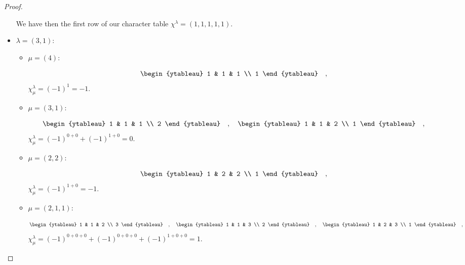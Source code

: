 \documentclass[8pt]{extarticle}
\newcommand{\<}{\langle}
\renewcommand{\>}{\rangle}
\theoremstyle{definition}
\begin{document}
\begin{proof}
\begin{itemize}
    We have then the first row of our character table $\chi^{\lambda} = (1,1,1,1,1)$.    
  \item
    $\lambda = (3,1)$:
    
    \begin{itemize}
      
    \item
      $\mu = (4)$:
      
      \begin{align*}
        \begin{ytableau}
          1 & 1 & 1 \\
          1
        \end{ytableau}\quad,
      \end{align*}
      $\chi_{\mu}^{\lambda}  = (-1)^{1} = -1$.

    \item
      $\mu = (3,1)$:
      
      \begin{align*}
        \begin{ytableau}
          1 & 1 & 1 \\
          2
        \end{ytableau}\quad,\quad
        \begin{ytableau}
          1 & 1 & 2 \\
          1
        \end{ytableau}\quad,        
      \end{align*}
      $\chi_{\mu}^{\lambda}  = (-1)^{0+0} + (-1)^{1 + 0} = 0$.

    \item
      $\mu = (2,2)$:
      
      \begin{align*}
        \begin{ytableau}
          1 & 2 & 2 \\
          1
        \end{ytableau}\quad,        
      \end{align*}
      $\chi_{\mu}^{\lambda}  = (-1)^{1+0} = -1$.

    \item
      $\mu = (2,1,1)$:
      
      \begin{align*}
        \begin{ytableau}
          1 & 1 & 2 \\
          3
        \end{ytableau}\quad,\quad
        \begin{ytableau}
          1 & 1 & 3 \\
          2
        \end{ytableau}\quad,\quad
        \begin{ytableau}
          1 & 2 & 3 \\
          1
        \end{ytableau}\quad,                
      \end{align*}
      $\chi_{\mu}^{\lambda}  = (-1)^{0+0+0} + (-1)^{0+0+0} + (-1)^{1+0+0}= 1$.


\end{itemize}
\end{itemize}
\end{proof}
\end{document}
